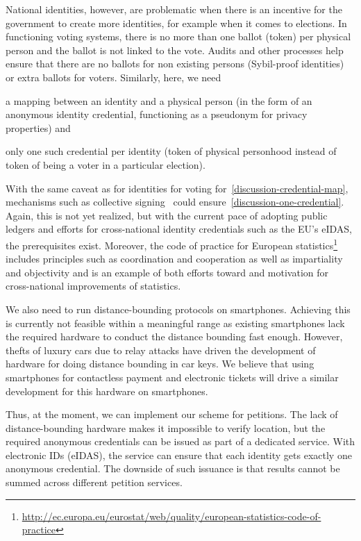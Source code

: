 National identities, however, are problematic when there is an
incentive for the government to create more identities, for example
when it comes to elections.  In functioning voting systems, there is
no more than one ballot (token) per physical person and the ballot is
not linked to the vote. Audits and other processes help ensure that
there are no ballots for non existing persons (Sybil-proof identities)
or extra ballots for voters. Similarly, here, we need
\begin{enumerate*}
\item\label{discussion-credential-map} a mapping between an identity and a 
  physical person (in the form of an anonymous identity credential, functioning 
  as a pseudonym for privacy
properties) and
\item\label{discussion-one-credential} only one such credential per identity 
  (token of physical personhood instead of token of being a voter in a 
  particular election).
\end{enumerate*}
With the same caveat as for identities for voting 
for~\ref{discussion-credential-map}, mechanisms such as collective 
signing~\cite{collective-signing} could ensure~\ref{discussion-one-credential}.
Again, this is not yet realized, but with the current pace
of adopting public ledgers and efforts for cross-national identity
credentials such as the EU's eIDAS, the prerequisites exist. Moreover,
the code of practice for European
statistics\footnote{\url{http://ec.europa.eu/eurostat/web/quality/european-statistics-code-of-practice}}
includes principles such as coordination and cooperation as well as
impartiality and objectivity and is an example of both efforts toward
and motivation for cross-national improvements of statistics.


We also need to run distance-bounding protocols on smartphones.
Achieving this is currently not feasible within a meaningful range as
existing smartphones lack the required hardware to conduct the
distance bounding fast enough.  However, thefts of luxury cars due to
relay attacks have driven the development of hardware for doing
distance bounding in car keys.  We believe that using smartphones for
contactless payment and electronic tickets will drive a similar
development for this hardware on smartphones.

Thus, at the moment, we can implement our scheme for petitions.
The lack of distance-bounding hardware makes it impossible to verify location, 
but the required anonymous credentials can be issued as part of a dedicated 
service.
With electronic IDs (eIDAS), the service can ensure that each identity gets 
exactly one anonymous credential.
The downside of such issuance is that results cannot be summed across different 
petition services.



